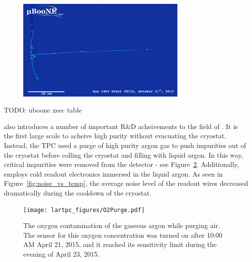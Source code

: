 \begin{figure}[htb]
  \centering
  \includegraphics[width=0.75\textwidth]{lartpc_figures/run3469_subrun574_event28734_col_small.png}
  \caption[\uboone Run 3469, Event 28734]{}
  \label{fig:uboone_r3469_e28734}
\end{figure}

TODO: uboone xsec table

\uboone also introduces a number of important R\&D acheivements to the field of \lartpcs.  It is the first large scale \lartpc to acheive high purity without evacuating the cryostat.  Instead, the TPC used a purge of high purity argon gas to push impurities out of the cryostat before colling the cryostat and filling with liquid argon.   In this way, critical impurities were removed from the detector - see Figure~\ref{fig:o2purge}.  Additionally, \uboone employs cold readout electronics immersed in the liquid argon.  As seen in Figure~\ref{fig:noise_vs_temp}, the average noise level of the readout wires decreased dramatically during the cooldown of the \uboone cryostat.

\begin{figure}[htb]
  \centering
  \texttt{[image: lartpc\_figures/O2Purge.pdf]}
  \caption[\uboone O2 Contamination]{The oxygen contamination of the gaseous argon while purging air. The sensor for this oxygen concentration was turned on after 10:00 AM April 21, 2015, and it reached its sensitivity limit during the evening of April 23, 2015. \cite{uboone_pub_1003}}
  \label{fig:o2purge}
\end{figure}



